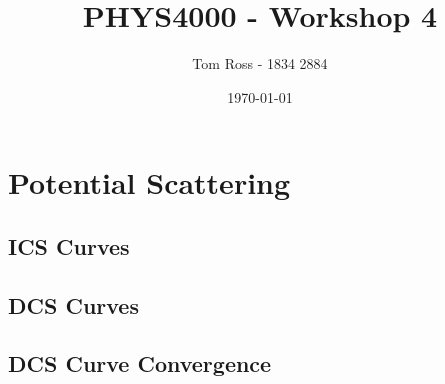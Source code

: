 \documentclass{article}
\title{PHYS4000 - Workshop 4}
\author{Tom Ross - 1834 2884}
\date{\today}
\begin{document}
\tableofcontents

\listoffigures

\listoftables

\clearpage

\section{Potential Scattering}
\label{sec:potential-scattering}

\subsection{ICS Curves}
\label{sec:ics-curves}

\begin{figure}[h]
  \begin{center}
    
  \end{center}
  \caption[Electron ICS Curves]{
  }
  \label{fig:ele-ics-curves}
\end{figure}

\begin{figure}[h]
  \begin{center}
    
  \end{center}
  \caption[Positron ICS Curves]{
  }
  \label{fig:pos-ics-curves}
\end{figure}

\subsection{DCS Curves}
\label{sec:dcs-curves}

\begin{figure}[h]
  \begin{center}
    
  \end{center}
  \caption[Electron DCS Curves]{
  }
  \label{fig:ele-dcs-curves}
\end{figure}

\begin{figure}[h]
  \begin{center}
    
  \end{center}
  \caption[Positron DCS Curves]{
  }
  \label{fig:pos-dcs-curves}
\end{figure}

\subsection{DCS Curve Convergence}
\label{sec:dcs-curve-conv}
\end{document}
